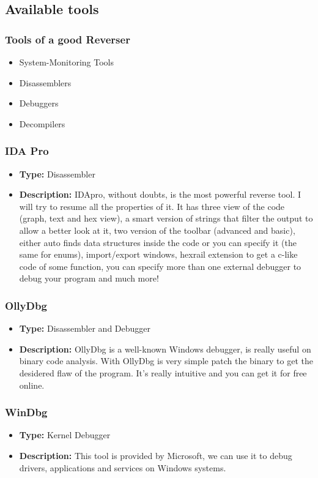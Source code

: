 \documentclass[]{beamer}
\begin{document}
	\subsection{Available tools}
		\begin{frame}
			\frametitle{Tools of a good Reverser}
				\begin{itemize}
					\item{System-Monitoring Tools}
					\item{Disassemblers}
					\item{Debuggers}
					\item{Decompilers}
				\end{itemize}
		\end{frame}
		\begin{frame}
			\frametitle{IDA Pro}
				\begin{itemize}
					\item{\textbf{Type:} Disassembler}
					\item{\textbf{Description:} IDApro, without doubts, is the most powerful reverse tool. I will try to resume all the properties of it. It has  three view of the code (graph, text and hex view), a smart version of strings that filter the output to allow a better look at it, two version of the toolbar (advanced and basic), either auto finds data structures inside the code or you can specify it (the same for enums), import/export windows, hexrail extension to get a c-like code of some function, you can specify more than one external debugger to debug your program and much more! }	
				\end{itemize}
		\end{frame}
		\begin{frame}
			\frametitle{OllyDbg}
				\begin{itemize}
					\item{\textbf{Type:} Disassembler and Debugger}
					\item{\textbf{Description:} OllyDbg is a well-known Windows debugger, is really useful on binary code analysis. With OllyDbg is very simple patch the binary to get the desidered flaw of the program. It's really intuitive and you can get it for free online.}
				\end{itemize}
		\end{frame}
		\begin{frame}
			\frametitle{WinDbg}
				\begin{itemize}
					\item{\textbf{Type:} Kernel Debugger}
					\item{\textbf{Description:} This tool is provided by Microsoft, we can use it to debug drivers, applications and services on Windows systems. }
				\end{itemize}
		\end{frame}	
\end{document}
